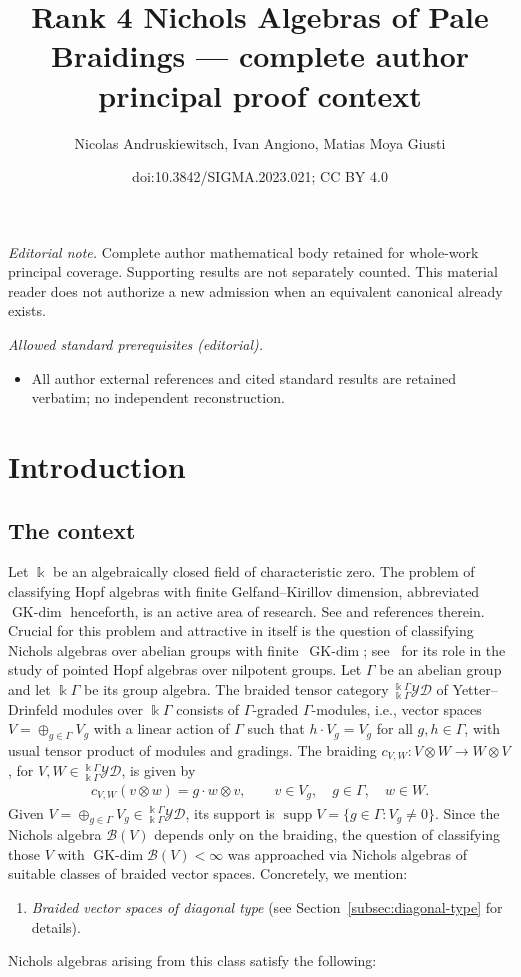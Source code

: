 \documentclass[10pt,a4paper]{amsart}
\title{Rank 4 Nichols Algebras of Pale Braidings — complete author principal proof context}
\author{Nicolas Andruskiewitsch, Ivan Angiono, Matias Moya Giusti}
\date{doi:10.3842/SIGMA.2023.021; CC BY 4.0}
\numberwithin{equation}{section}
\newcommand{\GK}{\operatorname{GK-dim}}
\newcommand{\supp}{\operatorname{supp}}
\newcommand{\toba}{\mathscr B}
\newcommand{\yd}[1]{{}_{#1}^{#1}\mathcal{YD}}
\begin{document}
\maketitle
\noindent\textit{Editorial note.} Complete author mathematical body retained for whole-work principal coverage. Supporting results are not separately counted. This material reader does not authorize a new admission when an equivalent canonical already exists.\par\medskip
\noindent\textit{Allowed standard prerequisites (editorial).}\begin{itemize}
\item All author external references and cited standard results are retained verbatim; no independent reconstruction.
\end{itemize}\medskip
\section{Introduction}
\subsection{The context}
Let $\Bbbk$ be an algebraically closed field of characteristic zero.
The problem of classifying Hopf algebras with finite Gelfand--Kirillov dimension, abbreviated $\GK$ henceforth,
is an active area of research. See \cite{AAH-triang,ASa-preNichols,angiono-campagnolo-sanmarco,brown-zhang}
and references therein.
Crucial for this problem and attractive in itself is the question of classifying Nichols algebras over abelian groups with finite~$\GK$; see~\cite{A-nilpotent} for its role in the study of pointed Hopf algebras over nilpotent groups.
Let $\Gamma$ be an abelian group and let $\Bbbk \Gamma$ be its group algebra.
The braided tensor category $\yd{\Bbbk\Gamma}$ of Yetter--Drinfeld modules over $\Bbbk \Gamma$
consists of $\Gamma$-graded $\Gamma$-modules, i.e., vector spaces $V = \oplus_{g \in \Gamma} V_g$
with a linear action of $\Gamma$ such that $h \cdot V_g = V_g$ for all $g,h\in \Gamma$, with usual tensor product of modules and gradings.
The braiding $c_{V,W}\colon V \otimes W \to W \otimes V$, for $V, W\in \yd{\Bbbk\Gamma}$, is given by
\begin{gather}\label{eq:braiding-ydG}
c_{V,W} (v \otimes w) = g\cdot w \otimes v, \qquad
v\in V_g, \quad g \in \Gamma, \quad w\in W.
\end{gather}
Given $V = \oplus_{g \in \Gamma} V_g \in\yd{\Bbbk\Gamma}$, its support is
$\supp V = \{g\in \Gamma\colon V_g \neq 0 \}$.
Since the Nichols algebra $\toba(V)$ depends only on the braiding, the question of classifying those $V$ with $\GK \toba(V) < \infty$
was approached via Nichols algebras of suitable classes of braided vector spaces. Concretely, we mention:
\begin{enumerate}[label=$(\alph*)$]\itemsep=0pt
\item\label{item:diagonal}
\emph{Braided vector spaces of diagonal type} (see Section~\ref{subsec:diagonal-type} for details).
\end{enumerate}
Nichols algebras arising from this class satisfy the following:
\end{document}
